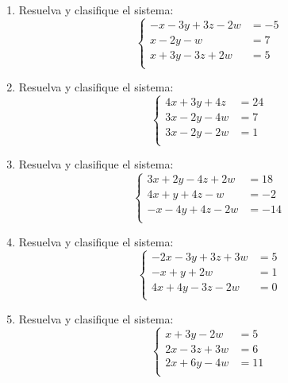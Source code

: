\documentclass[11pt]{article}
\begin{document}
\begin{enumerate}
\[
\left\{\begin{aligned}
4x+y-3w&=-2\\
3x+4y-4z&=-9\\
-3x+2y+2w&=1\\
\end{aligned}\right.
\]
\item Resuelva y clasifique el sistema:
\[
\left\{\begin{aligned}
-x-3y+3z-2w&=-5\\
x-2y-w&=7\\
x+3y-3z+2w&=5\\
\end{aligned}\right.
\]
\item Resuelva y clasifique el sistema:
\[
\left\{\begin{aligned}
4x+3y+4z&=24\\
3x-2y-4w&=7\\
3x-2y-2w&=1\\
\end{aligned}\right.
\]
\item Resuelva y clasifique el sistema:
\[
\left\{\begin{aligned}
3x+2y-4z+2w&=18\\
4x+y+4z-w&=-2\\
-x-4y+4z-2w&=-14\\
\end{aligned}\right.
\]
\item Resuelva y clasifique el sistema:
\[
\left\{\begin{aligned}
-2x-3y+3z+3w&=5\\
-x+y+2w&=1\\
4x+4y-3z-2w&=0\\
\end{aligned}\right.
\]
\item Resuelva y clasifique el sistema:
\[
\left\{\begin{aligned}
x+3y-2w&=5\\
2x-3z+3w&=6\\
2x+6y-4w&=11\\
\end{aligned}\right.
\]
\end{enumerate}
\end{document}
